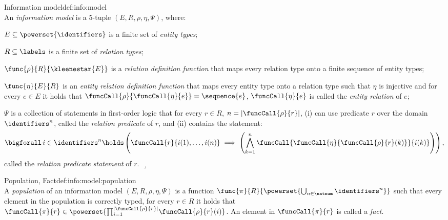 %
%

\begin{ncdefine}{Information model}{def:info:model}{\quad\\}
An \emph{information model} is a 5-tuple $(E,R,\rho,\eta,\Psi)$, where:
\begin{compactitem}
\item
$E \subseteq \powerset{\identifiers}$ is a finite set of \emph{entity types};
\item
$R \subseteq \labels$ is a finite set of \emph{relation types};
\item
$\func{\rho}{R}{\kleenestar{E}}$ is a \emph{relation definition function} that maps every relation type onto a finite sequence of entity types;
\item
$\func{\eta}{E}{R}$ is an \emph{entity relation definition function} that maps every entity type onto a relation type such that
$\eta$ is injective and for every $e \in E$ it holds that $\funcCall{\rho}{\funcCall{\eta}{e}}=\sequence{e}$, $\funcCall{\eta}{e}$ is called the \emph{entity relation} of $e$;
\item
$\Psi$ is a collection of statements in first-order logic that for every $r \in R$, $n=|\funcCall{\rho}{r}|$, 
(i) can use predicate $r$ over the domain $\identifiers^n$, called the \emph{relation predicate} of $r$, 
and (ii) contains the statement:
\[
\mathop{\bigforall} i \in \identifiers^n \holds \left(\funcCall{r}{i(1),\ldots,i(n)} \implies \left(\bigwedge_{k=1}^{n} \funcCall{\funcCall{\eta}{\funcCall{\rho}{r}(k)}}{i(k)}\right)\right),
\]
called the \emph{relation predicate statement} of $r$.
\hfill\ensuremath{\lrcorner}
\end{compactitem}	
\end{ncdefine}

\begin{define}{Population, Fact}{def:info:model:population}{\quad\\}
A \emph{population} of an information model $(E,R,\rho,\eta,\Psi)$ is a function $\func{\pi}{R}{\powerset{\bigcup_{n \in \natnum}{\identifiers^n}}}$
such that every element in the population is correctly typed, \ie
for every $r \in R$ it holds that $\funcCall{\pi}{r} \in \powerset{\prod_{i=1}^{|\funcCall{\rho}{r}|}{\!\funcCall{\rho}{r}(i)}}$.
An element in $\funcCall{\pi}{r}$ is called a \emph{fact}.
\end{define}